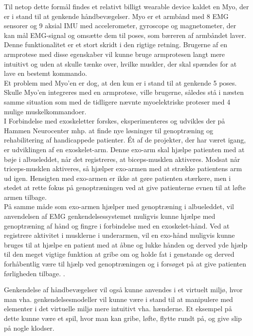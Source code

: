 Til netop dette formål findes et relativt billigt wearable device kaldet en Myo, der er i stand til at genkende håndbevægelser. Myo er et armbånd med 8 EMG sensorer og 9 aksial IMU med accelerometer, gyroscope og magnetometer, der kan mål EMG-signal og omsætte dem til poses, som bæreren af armbåndet laver. \\
Denne funktionalitet er et stort skridt i den rigtige retning. Brugerne af en armprotese med disse egenskaber vil kunne bruge armprotesen langt mere intuitivt og uden at skulle tænke over, hvilke muskler, der skal spændes for at lave en bestemt kommando.\\
Et problem med Myo'en er dog, at den kun er i stand til at genkende 5 poses. Skulle Myo'en integreres med en armprotese, ville brugerne, således stå i næsten samme situation som med de tidligere nævnte myoelektriske proteser med 4 mulige muskelkommandoer.\\

I Forbindelse med exoskeletter forskes, eksperimenteres og udvikles der på Hammen Neurocenter mhp. at finde nye løsninger til genoptræning og rehabilitering af handicappede patienter. Ét af de projekter, der har været igang, er udviklingen af en exoskelet-arm\citep{RefWorks:7}. Denne exo-arm skal hjælpe patienten med at bøje i albueleddet, når det registreres, at biceps-musklen aktiveres. Modsat når triceps-musklen aktiveres, så hjælper exo-armen med at strække patientens arm ud igen. Hensigten med exo-armen er ikke at gøre patienten stærkere, men i stedet at rette fokus på genoptræningen ved at give patienterne evnen til at løfte armen tilbage.\\

På samme måde som exo-armen hjælper med genoptræning i albueleddet, vil anvendelsen af EMG genkendelsessystemet muligvis kunne hjælpe med genoptræning af hånd og fingre i forbindelse med en exoskelet-hånd. Ved at registrere aktivitet i musklerne i underarmen, vil en exo-hånd muligvis kunne bruges til at hjælpe en patient med at åbne og lukke hånden og derved yde hjælp til den meget vigtige funktion at gribe om og holde fat i genstande og derved forhåbentlig være til hjælp ved genoptræningen og i forsøget på at give patienten førligheden tilbage. .

Genkendelse af håndbevægelser vil også kunne anvendes i et virtuelt miljø, hvor man vha.  genkendelsesmodeller vil kunne være i stand til at manipulere med elementer i det virtuelle miljø mere intuitivt vha. hænderne. Et eksempel på dette kunne være et spil, hvor man kan gribe, løfte, flytte rundt på, og give slip på nogle klodser.
